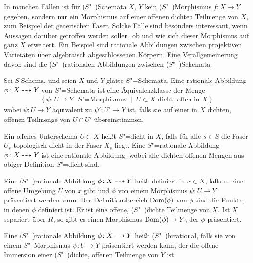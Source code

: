 In manchen Fällen ist für ($S$"~)Schemata $X$, $Y$ kein
($S$"~)Morphismus $f\colon X\to Y$ gegeben, sondern nur ein Morphismus
auf einer offenen dichten Teilmenge von $X$, zum Beispiel der
generischen Faser. Solche Fälle sind besonders interessant, wenn Aussagen
darüber getroffen werden sollen, ob und wie sich dieser Morphismus auf
ganz $X$ erweitert. Ein Beispiel sind rationale Abbildungen zwischen
projektiven Varietäten über algebraisch abgeschlossenen Körpern.
Eine Verallgemeinerung davon sind die ($S$"~)rationalen Abbildungen
zwischen ($S$"~)Schemata.
\begin{Definition}\label{def:ratabb}
  Sei $S$ Schema, und seien $X$ und $Y$ glatte $S$"=Schemata.
  Eine rationale Abbildung $\phi\colon X\dashrightarrow Y$ von
  $S$"=Schemata ist eine Äquivalenzklasse der Menge
  \begin{gather*}
    \left\{
      \psi\colon U\to Y \text{ $S$"=Morphismus}
      \;\middle|\;
      U\subset X \text{ dicht, offen in $X$}
    \right\}
  \end{gather*}
  wobei $\psi\colon U\to Y$ äquivalent zu $\psi'\colon U'\to Y$ ist,
  falls sie auf einer in $X$ dichten, offenen Teilmenge von $U\cap U'$
  übereinstimmen.
  
  Ein offenes Unterschema $U\subset X$ heißt $S$"=dicht in $X$,
  falls für alle $s\in S$ die Faser $U_s$ %
  topologisch dicht in der Faser $X_s$ %
  liegt.
  Eine $S$"=rationale Abbildung $\phi\colon X\dashrightarrow Y$ ist eine
  rationale Abbildung, wobei alle dichten offenen Mengen aus obiger
  Definition $S$"=dicht sind.

  Eine ($S$"~)rationale Abbildung $\phi\colon X\dashrightarrow Y$ heißt definiert
  in $x\in X$, falls es eine offene Umgebung $U$ von $x$ gibt und
  $\phi$ von einem Morphismus $\psi\colon U\to Y$ präsentiert werden
  kann.
  Der Definitionsbereich $\operatorname{Dom}(\phi)$ von $\phi$ sind die
  Punkte, in denen $\phi$ definiert ist. Er ist eine offene,
  ($S$"~)dichte Teilmenge von $X$. Ist $X$ separiert über $R$, so gibt
  es einen Morphismus $\operatorname{Dom}(\phi)\to Y$, der $\phi$ präsentiert.
  
  Eine ($S$"~)rationale Abbildung $\phi\colon X\dashrightarrow Y$ heißt
  ($S$"~)birational, falls sie von einem $S$"~Mor\-phis\-mus
  ${\psi\colon U\to Y}$ präsentiert werden kann, der die offene
  Immersion einer ($S$"~)dich\-te, offenen Teilmenge von $Y$ ist.
\end{Definition}

